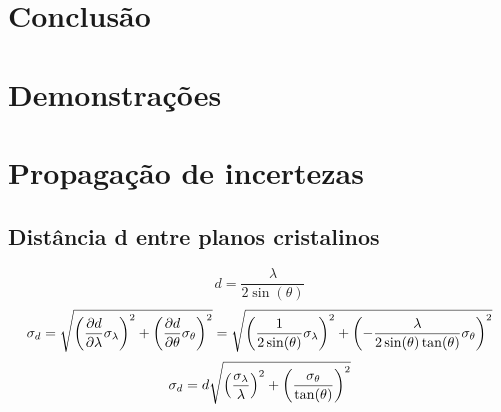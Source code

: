 \documentclass[article,12pt,openright,oneside,a4paper,brazil]{abntex2}
\begin{document}
\section{Conclusão}

\appendix

\newpage




\nocite{*}

\section{Demonstrações}

\section{Propagação de incertezas}

\subsection{Distância d entre planos cristalinos}
$$d=\frac{\lambda}{2\sin(\theta)}$$
$$\sigma_d=\sqrt{\qty(\pdv{d}{\lambda}\sigma_\lambda)^2+\qty(\pdv{d}{\theta}\sigma_\theta)^2}=\sqrt{\qty(\frac{1}{2\sin(\theta)}\sigma_\lambda)^2+\qty(-\frac{\lambda}{2\sin(\theta)\tan(\theta)}\sigma_\theta)^2}$$
$$\sigma_d=d\sqrt{\qty(\frac{\sigma_\lambda}{\lambda})^2+\qty(\frac{\sigma_\theta}{\tan(\theta)})^2}$$
\end{document}

